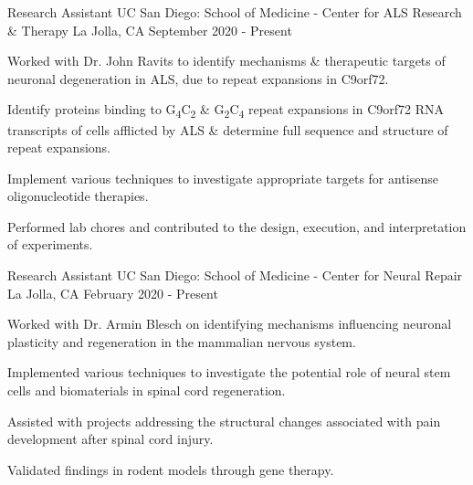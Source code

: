 \begin{cventries}
\cventry
{Research Assistant} %
{UC San Diego: School of Medicine - Center for ALS Research \& Therapy} %
{La Jolla, CA} %
{September 2020 - Present} %
{
  \begin{cvitems} %
    \item {Worked with Dr. John Ravits to identify mechanisms \& therapeutic targets of neuronal degeneration in ALS, due to repeat expansions in C9orf72.}
    \item {Identify proteins binding to G\textsubscript{4}C\textsubscript{2} \& G\textsubscript{2}C\textsubscript{4} repeat expansions in C9orf72 RNA transcripts of cells afflicted by ALS \& determine full sequence and structure of repeat expansions.}
    \item {Implement various techniques to investigate appropriate targets for antisense oligonucleotide therapies.}
    \item {Performed lab chores and contributed to the design, execution, and interpretation of experiments.}
  \end{cvitems}
}
\cventry
{Research Assistant} %
{UC San Diego: School of Medicine - Center for Neural Repair} %
{La Jolla, CA} %
{February 2020 - Present} %
{
  \begin{cvitems} %
    \item {Worked with Dr. Armin Blesch on identifying mechanisms influencing neuronal plasticity and regeneration in the mammalian nervous system.}
    \item {Implemented various techniques to investigate the potential role of neural stem cells and biomaterials in spinal cord regeneration.}
    \item {Assisted with projects addressing the structural changes associated with pain development after spinal cord injury.}
    \item {Validated findings in rodent models through gene therapy.}

\end{cvitems}}
\end{cventries}
